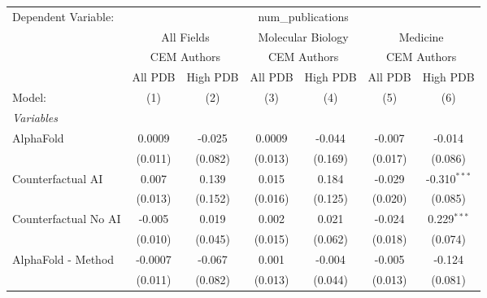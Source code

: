\begingroup
\centering
\begin{tabular}{lcccccc}
   \tabularnewline \midrule \midrule
   Dependent Variable: & \multicolumn{6}{c}{num\_publications}\\
 & \multicolumn{2}{c}{All Fields} & \multicolumn{2}{c}{Molecular Biology} & \multicolumn{2}{c}{Medicine} \\
\cmidrule(lr){2-3} \cmidrule(lr){4-5} \cmidrule(lr){6-7}
 & \multicolumn{2}{c}{CEM Authors} & \multicolumn{2}{c}{CEM Authors} & \multicolumn{2}{c}{CEM Authors} \\
\cmidrule(lr){2-3} \cmidrule(lr){4-5} \cmidrule(lr){6-7}
 & \multicolumn{1}{c}{All PDB} & \multicolumn{1}{c}{High PDB} & \multicolumn{1}{c}{All PDB} & \multicolumn{1}{c}{High PDB} & \multicolumn{1}{c}{All PDB} & \multicolumn{1}{c}{High PDB} \\
\cmidrule(lr){2-2} \cmidrule(lr){3-3} \cmidrule(lr){4-4} \cmidrule(lr){5-5} \cmidrule(lr){6-6} \cmidrule(lr){7-7}
   Model:                                                     & (1)     & (2)           & (3)     & (4)           & (5)           & (6)\\  
   \midrule
   \emph{Variables}\\
   AlphaFold                                                  & 0.0009  & -0.025        & 0.0009  & -0.044        & -0.007        & -0.014\\   
                                                              & (0.011) & (0.082)       & (0.013) & (0.169)       & (0.017)       & (0.086)\\   
   Counterfactual AI                                          & 0.007   & 0.139         & 0.015   & 0.184         & -0.029        & -0.310$^{***}$\\   
                                                              & (0.013) & (0.152)       & (0.016) & (0.125)       & (0.020)       & (0.085)\\   
   Counterfactual No AI                                       & -0.005  & 0.019         & 0.002   & 0.021         & -0.024        & 0.229$^{***}$\\   
                                                              & (0.010) & (0.045)       & (0.015) & (0.062)       & (0.018)       & (0.074)\\   
   AlphaFold - Method                                         & -0.0007 & -0.067        & 0.001   & -0.004        & -0.005        & -0.124\\   
                                                              & (0.011) & (0.082)       & (0.013) & (0.044)       & (0.013)       & (0.081)\\   

\end{tabular}
